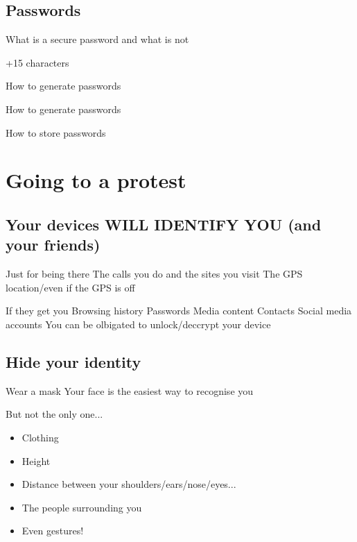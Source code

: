 \documentclass[11pt]{beamer}
\begin{document}
\subsection{Passwords}
\begin{frame}{What is a secure password and what is not}

\end{frame}
+15 characters
\begin{frame}{How to generate passwords}

\end{frame}
\begin{frame}{How to generate passwords}

\end{frame}
\begin{frame}{How to store passwords}

\end{frame}
\section{Going to a protest}
\subsection{Your devices WILL IDENTIFY YOU (and your friends)}
\begin{frame}{Just for being there}
The calls you do and the sites you visit
The GPS location/even if  the GPS  is off
\end{frame}
\begin{frame}{If they get you}
Browsing history
Passwords
Media content
Contacts
Social media accounts
You can be olbigated to unlock/deccrypt your device
\end{frame}
\subsection{Hide your identity}
\begin{frame}{Wear a mask}
Your face is the easiest way to recognise you
\end{frame}
\begin{frame}{But not the only one...}
\begin{itemize}
\item Clothing
\item Height
\item Distance between your shoulders/ears/nose/eyes...
\item The people surrounding you
\item Even gestures!
\end{itemize}
\end{frame}
\end{document}
